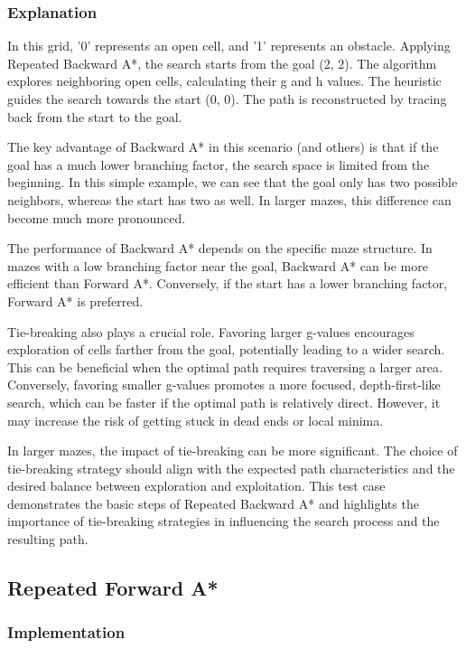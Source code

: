 \documentclass[12pt]{article}
\begin{document}
\subsubsection{Explanation}

In this grid, '0' represents an open cell, and '1' represents an obstacle. Applying Repeated Backward A*, the search starts from the goal (2, 2). The algorithm explores neighboring open cells, calculating their g and h values. The heuristic guides the search towards the start (0, 0). The path is reconstructed by tracing back from the start to the goal.

The key advantage of Backward A* in this scenario (and others) is that if the goal has a much lower branching factor, the search space is limited from the beginning. In this simple example, we can see that the goal only has two possible neighbors, whereas the start has two as well. In larger mazes, this difference can become much more pronounced.

The performance of Backward A* depends on the specific maze structure. In mazes with a low branching factor near the goal, Backward A* can be more efficient than Forward A*. Conversely, if the start has a lower branching factor, Forward A* is preferred.

Tie-breaking also plays a crucial role. Favoring larger g-values encourages exploration of cells farther from the goal, potentially leading to a wider search. This can be beneficial when the optimal path requires traversing a larger area. Conversely, favoring smaller g-values promotes a more focused, depth-first-like search, which can be faster if the optimal path is relatively direct. However, it may increase the risk of getting stuck in dead ends or local minima.

In larger mazes, the impact of tie-breaking can be more significant. The choice of tie-breaking strategy should align with the expected path characteristics and the desired balance between exploration and exploitation. This test case demonstrates the basic steps of Repeated Backward A* and highlights the importance of tie-breaking strategies in influencing the search process and the resulting path.


\subsection{Repeated Forward A*}

\subsubsection{Implementation}
\end{document}
